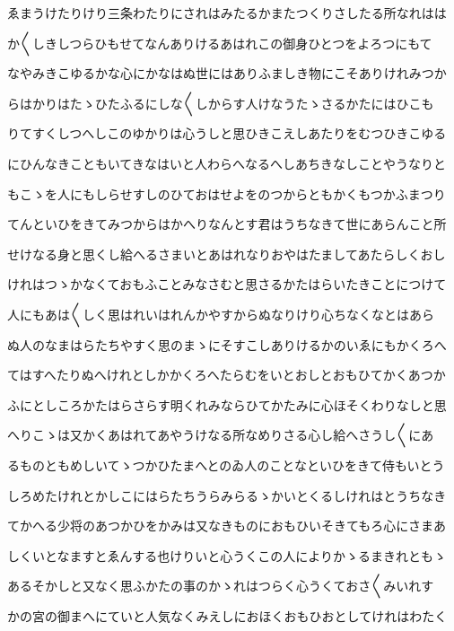 \documentclass[a4paper,11pt,landscape]{ltjtarticle}
\begin{document}
\par\medskip
ゑまうけたりけり三条わたりにされはみたるかまたつくりさしたる所なれはは
\par\medskip
か〱しきしつらひもせてなんありけるあはれこの御身ひとつをよろつにもて
\par\medskip
なやみきこゆるかな心にかなはぬ世にはありふましき物にこそありけれみつか
\par\medskip
らはかりはたゝひたふるにしな〱しからす人けなうたゝさるかたにはひこも
\par\medskip
りてすくしつへしこのゆかりは心うしと思ひきこえしあたりをむつひきこゆる
\par\medskip
にひんなきこともいてきなはいと人わらへなるへしあちきなしことやうなりと
\par\medskip
もこゝを人にもしらせすしのひておはせよをのつからともかくもつかふまつり
\par\medskip
てんといひをきてみつからはかへりなんとす君はうちなきて世にあらんこと所
\par\medskip
せけなる身と思くし給へるさまいとあはれなりおやはたましてあたらしくおし
\par\medskip
けれはつゝかなくておもふことみなさむと思さるかたはらいたきことにつけて
\par\medskip
人にもあは〱しく思はれいはれんかやすからぬなりけり心ちなくなとはあら
\par\medskip
ぬ人のなまはらたちやすく思のまゝにそすこしありけるかのいゑにもかくろへ
\par\medskip
てはすへたりぬへけれとしかかくろへたらむをいとおしとおもひてかくあつか
\par\medskip
ふにとしころかたはらさらす明くれみならひてかたみに心ほそくわりなしと思
\par\medskip
へりこゝは又かくあはれてあやうけなる所なめりさる心し給へさうし〱にあ
\par\medskip
るものともめしいてゝつかひたまへとのゐ人のことなといひをきて侍もいとう
\par\medskip
しろめたけれとかしこにはらたちうらみらるゝかいとくるしけれはとうちなき
\par\medskip
てかへる少将のあつかひをかみは又なきものにおもひいそきてもろ心にさまあ
\par\medskip
しくいとなますとゑんする也けりいと心うくこの人によりかゝるまきれともゝ
\par\medskip
あるそかしと又なく思ふかたの事のかゝれはつらく心うくておさ〱みいれす
\par\medskip
かの宮の御まへにていと人気なくみえしにおほくおもひおとしてけれはわたく
\par\medskip
\end{document}
